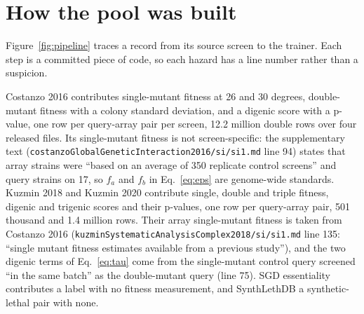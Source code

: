 
\section{How the pool was built}

Figure~\ref{fig:pipeline} traces a record from its source screen to the trainer.
Each step is a committed piece of code, so each hazard has a line number rather than
a suspicion.


Costanzo 2016 contributes single-mutant fitness at 26 and 30 degrees, double-mutant
fitness with a colony standard deviation, and a digenic score with a p-value, one row
per query-array pair per screen, 12.2 million double rows over four released files.
Its single-mutant fitness is not screen-specific: the supplementary text
(\texttt{costanzoGlobalGeneticInteraction2016/si/si1.md} line 94) states that array
strains were ``based on an average of 350 replicate control screens'' and query
strains on 17, so $f_a$ and $f_b$ in Eq.~\ref{eq:eps} are genome-wide standards.
Kuzmin 2018 and Kuzmin 2020 contribute single, double and triple fitness, digenic and
trigenic scores and their p-values, one row per query-array pair, 501 thousand and
1.4 million rows. Their array single-mutant fitness is taken from Costanzo 2016
(\texttt{kuzminSystematicAnalysisComplex2018/si/si1.md} line 135: ``single mutant
fitness estimates available from a previous study''), and the two digenic terms of
Eq.~\ref{eq:tau} come from the single-mutant control query screened ``in the same
batch'' as the double-mutant query (line 75). SGD essentiality contributes a label
with no fitness measurement, and SynthLethDB a synthetic-lethal pair with none.

